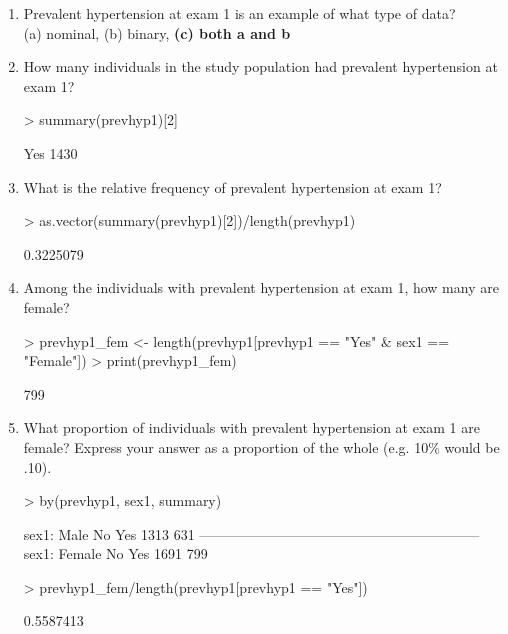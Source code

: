 \documentclass{article}
\begin{document}
\begin{enumerate}
  \item Prevalent hypertension at exam 1 is an example of what type of data?\\
(a) nominal, (b) binary, \textbf{(c) both a and b}
  \item How many individuals in the study population had prevalent hypertension at exam 1?
  
\begin{Schunk}
\begin{Sinput}
> summary(prevhyp1)[2]
\end{Sinput}
\begin{Soutput}
 Yes 
1430 
\end{Soutput}
\end{Schunk}

  \item What is the relative frequency of prevalent hypertension at exam 1?

\begin{Schunk}
\begin{Sinput}
> as.vector(summary(prevhyp1)[2])/length(prevhyp1)
\end{Sinput}
\begin{Soutput}
[1] 0.3225079
\end{Soutput}
\end{Schunk}


\item Among the individuals with prevalent hypertension at exam 1, how many are female?

\begin{Schunk}
\begin{Sinput}
> prevhyp1_fem <- length(prevhyp1[prevhyp1 == "Yes" & sex1 == "Female"])
> print(prevhyp1_fem)
\end{Sinput}
\begin{Soutput}
[1] 799
\end{Soutput}
\end{Schunk}
\pagebreak
  \item What proportion of individuals with prevalent hypertension at exam 1 are female? Express your answer as a proportion of the whole (e.g. 10\% would be .10).

\begin{Schunk}
\begin{Sinput}
> by(prevhyp1, sex1, summary)
\end{Sinput}
\begin{Soutput}
sex1: Male
  No  Yes 
1313  631 
------------------------------------------------------------ 
sex1: Female
  No  Yes 
1691  799 
\end{Soutput}
\begin{Sinput}
> prevhyp1_fem/length(prevhyp1[prevhyp1 == "Yes"])
\end{Sinput}
\begin{Soutput}
[1] 0.5587413
\end{Soutput}
\end{Schunk}



\end{enumerate}
\end{document}
